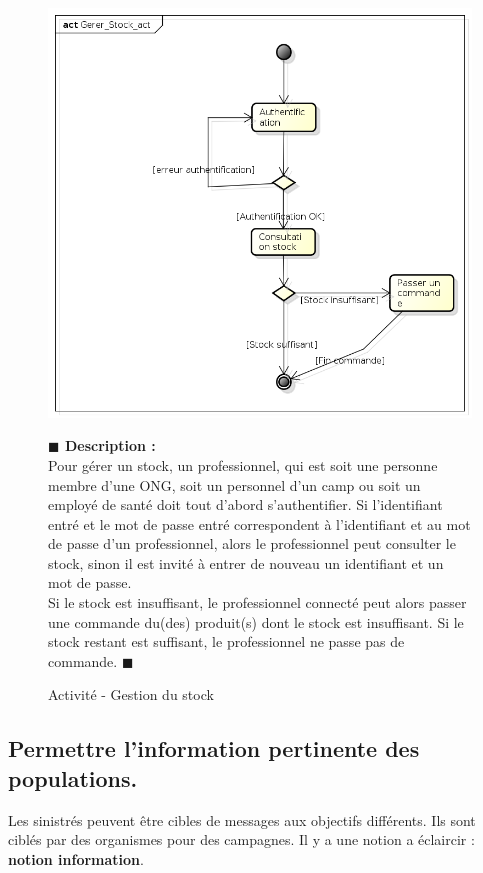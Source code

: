 \documentclass[11pt, titlepage]{report}
\newcommand{\debutDescription}{\noindent\textbf{\textcolor{DescriptionColor}{$\blacksquare$  Description : \\}}}
\newcommand{\finDescription}{\noindent\textcolor{DescriptionColor}{$\blacksquare$}}
\begin{document}
\begin{figure}[h!]
\begin{center}
\includegraphics[scale=.4]{../images/diagrammes/uml/exigence_4/act_gerer_stock.png} 
\caption{Activité - Gestion du stock}
\end{center}
\debutDescription
	Pour gérer un stock, un professionnel, qui est soit une personne membre d'une ONG, soit un personnel d'un camp ou soit un employé de santé doit tout d'abord s'authentifier. Si l'identifiant entré et le mot de passe entré correspondent à l'identifiant et au mot de passe d'un professionnel, alors le professionnel peut consulter le stock, sinon il est invité à entrer de nouveau un identifiant et un mot de passe.\\
	Si le stock est insuffisant, le professionnel connecté peut alors passer une commande du(des) produit(s) dont le stock est insuffisant. Si le stock restant est suffisant, le professionnel ne passe pas de commande.
\finDescription
\end{figure}

\clearpage
\subsection{Permettre l'information pertinente des populations.}
Les sinistrés peuvent être cibles de messages aux objectifs différents. Ils sont ciblés par des organismes pour des campagnes. Il y a une notion a éclaircir : \textbf{notion information}.
\end{document}
